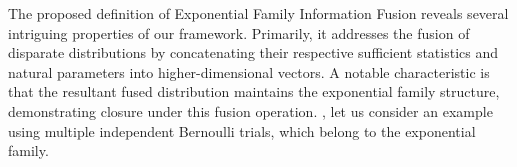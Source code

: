 \documentclass[letterpaper]{article} %
\theoremstyle{definition}
\theoremstyle{remark}
\begin{document}

The proposed definition of Exponential Family Information Fusion reveals several intriguing properties of our framework. Primarily, it addresses the fusion of disparate distributions by concatenating their respective sufficient statistics and natural parameters into higher-dimensional vectors. A notable characteristic is that the resultant fused distribution maintains the exponential family structure, demonstrating closure under this fusion operation. , let us consider an example using multiple independent Bernoulli trials, which belong to the exponential family.
\end{document}
